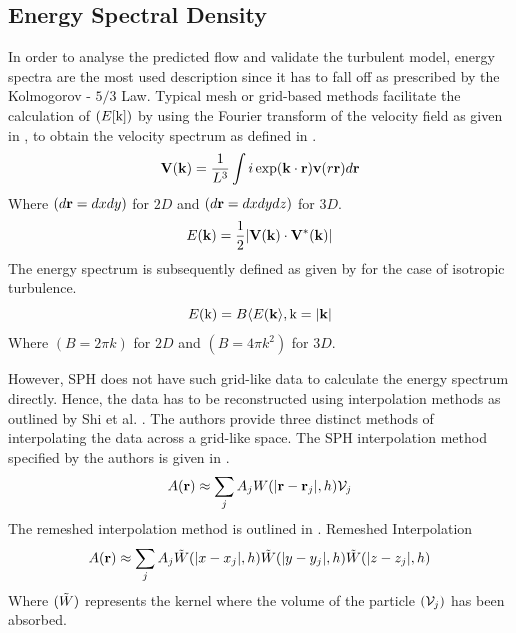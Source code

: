 \subsection{Energy Spectral Density}
In order to analyse the predicted flow and validate the turbulent model, energy spectra are the most used description since it has to fall off as prescribed by the  Kolmogorov - $5/3$ Law.
Typical mesh or grid-based methods facilitate the calculation of $(E[\mathrm{k}])$ by using the Fourier transform of the velocity field as given in , to obtain the velocity spectrum as defined in .
\begin{equation}
    \mathbf{V}(\mathbf{k}) = \frac{1}{L^3} \int i \exp(\mathbf{k} \cdot \mathbf{r}) \mathbf{v}(r\mathbf{r}) d\mathbf{r}
    \label{eq:Shi2013-vel-FT}
\end{equation}
Where $(d\mathbf{r}=dxdy)$ for $2D$ and $(d\mathbf{r}=dxdydz)$ for $3D$.
\begin{equation}
    E(\mathbf{k}) = \frac{1}{2} |\mathbf{V}(\mathbf{k}) \cdot \mathbf{V}^*(\mathbf{k}) |
    \label{eq:Shi2013-vel-spectrum}
\end{equation}
The energy spectrum is subsequently defined as given by  for the case of isotropic turbulence.
\begin{equation}
    E(\mathrm{k}) = B \langle E(\mathbf{k} \rangle, \mathrm{k} = |\mathbf{k}|
    \label{eq:Shi2013-energy-spectrum}
\end{equation}
Where $(B=2\pi k)$ for $2D$ and $(B=4\pi k^2)$ for $3D$.

However, SPH does not have such grid-like data to calculate the energy spectrum directly. Hence, the data has to be reconstructed using interpolation methods as outlined by Shi et al. \parencite{Shi2013}.
The authors provide three distinct methods of interpolating the data across a grid-like space. 
The SPH interpolation method specified by the authors is given in .
\begin{equation}
    A(\mathbf{r}) \approx \sum_j A_j W(|\mathbf{r} - \mathbf{r}_j|, h) \mathcal{V}_j
    \label{eq:Shi2013-sph-interpolation}
\end{equation}
The remeshed interpolation method is outlined in .
Remeshed Interpolation
\begin{equation}
    A(\mathbf{r}) \approx \sum_j A_j \Tilde{W}(|x-x_j|, h) \Tilde{W}(|y-y_j|, h) \Tilde{W}(|z-z_j|, h)
    \label{eq:Shi2013-remeshed-interpolation}
\end{equation}
Where $(\Tilde{W})$ represents the kernel where the volume of the particle $(\mathcal{V}_j)$ has been absorbed.


